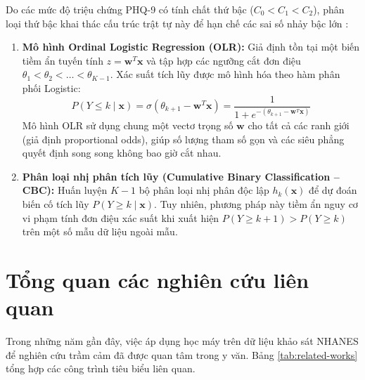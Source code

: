 Do các mức độ triệu chứng PHQ-9 có tính chất thứ bậc ($C_0 < C_1 < C_2$), phân loại thứ bậc khai thác cấu trúc trật tự này để hạn chế các sai số nhảy bậc lớn \cite{mccullagh1980regression, frank2001simple}:
\begin{enumerate}
    \item \textbf{Mô hình Ordinal Logistic Regression (OLR):} Giả định tồn tại một biến tiềm ẩn tuyến tính $z = \mathbf{w}^T \mathbf{x}$ và tập hợp các ngưỡng cắt đơn điệu $\theta_1 < \theta_2 < \dots < \theta_{K-1}$. Xác suất tích lũy được mô hình hóa theo hàm phân phối Logistic:
    \begin{equation}
        P(Y \le k \mid \mathbf{x}) = \sigma(\theta_{k+1} - \mathbf{w}^T \mathbf{x}) = \frac{1}{1 + e^{-(\theta_{k+1} - \mathbf{w}^T \mathbf{x})}}
    \end{equation}
    Mô hình OLR sử dụng chung một vectơ trọng số $\mathbf{w}$ cho tất cả các ranh giới (giả định proportional odds), giúp số lượng tham số gọn và các siêu phẳng quyết định song song không bao giờ cắt nhau.
    \item \textbf{Phân loại nhị phân tích lũy (Cumulative Binary Classification -- CBC):} Huấn luyện $K-1$ bộ phân loại nhị phân độc lập $h_k(\mathbf{x})$ để dự đoán biến cố tích lũy $P(Y \ge k \mid \mathbf{x})$. Tuy nhiên, phương pháp này tiềm ẩn nguy cơ vi phạm tính đơn điệu xác suất khi xuất hiện $P(Y \ge k+1) > P(Y \ge k)$ trên một số mẫu dữ liệu ngoài mẫu.
\end{enumerate}

\section{Tổng quan các nghiên cứu liên quan}
\label{sec:nghien-cuu-lien-quan}

Trong những năm gần đây, việc áp dụng học máy trên dữ liệu khảo sát NHANES để nghiên cứu trầm cảm đã được quan tâm trong y văn. Bảng \ref{tab:related-works} tổng hợp các công trình tiêu biểu liên quan.

